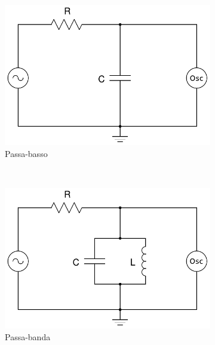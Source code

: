 \begin{figure}[h]
   \centering
        \begin{subfigure}[b]{0.3\textwidth}
                \includegraphics[width=\textwidth]{s_basso.pdf}
                \caption{Passa-basso}
                \label{fig:basso}
        \end{subfigure}%
        ~
        \begin{subfigure}[b]{0.3\textwidth}
                \includegraphics[width=\textwidth]{s_banda.pdf}
                \caption{Passa-banda}
                \label{fig:banda}
        \end{subfigure}
        ~
        \begin{subfigure}[b]{0.3\textwidth}

\end{subfigure}
\end{figure}

